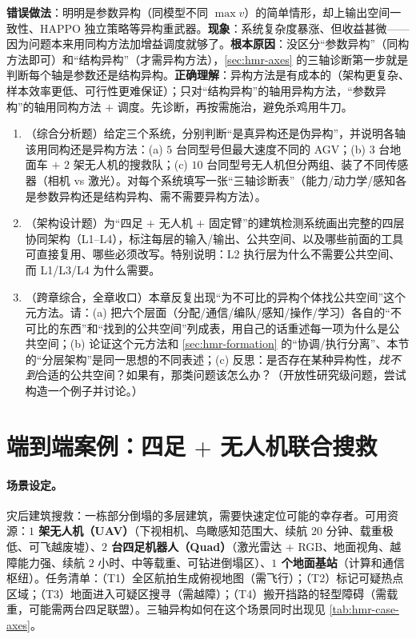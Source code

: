 \begin{pitfall}
\textbf{错误做法}：明明是参数异构（同模型不同 $\max v$）的简单情形，却上输出空间一致性、HAPPO 独立策略等异构重武器。\textbf{现象}：系统复杂度暴涨、但收益甚微——因为问题本来用同构方法加增益调度就够了。\textbf{根本原因}：没区分“参数异构”（同构方法即可）和“结构异构”（才需异构方法），\cref{sec:hmr-axes} 的三轴诊断第一步就是判断每个轴是参数还是结构异构。\textbf{正确理解}：异构方法是有成本的（架构更复杂、样本效率更低、可行性更难保证）；只对“结构异构”的轴用异构方法，“参数异构”的轴用同构方法 $+$ 调度。先诊断，再按需施治，避免杀鸡用牛刀。
\end{pitfall}

\begin{practice}
\begin{enumerate}
  \item （综合分析题）给定三个系统，分别判断“是真异构还是伪异构”，并说明各轴该用同构还是异构方法：(a) $5$ 台同型号但最大速度不同的 AGV；(b) $3$ 台地面车 $+$ $2$ 架无人机的搜救队；(c) $10$ 台同型号无人机但分两组、装了不同传感器（相机 vs 激光）。对每个系统填写一张“三轴诊断表”（能力/动力学/感知各是参数异构还是结构异构、需不需要异构方法）。
  \item （架构设计题）为“四足 $+$ 无人机 $+$ 固定臂”的建筑检测系统画出完整的四层协同架构（L1--L4），标注每层的输入/输出、公共空间、以及哪些前面的工具可直接复用、哪些必须改写。特别说明：L2 执行层为什么不需要公共空间、而 L1/L3/L4 为什么需要。
  \item （跨章综合，全章收口）本章反复出现“为不可比的异构个体找公共空间”这个元方法。请：(a) 把六个层面（分配/通信/编队/感知/操作/学习）各自的“不可比的东西”和“找到的公共空间”列成表，用自己的话重述每一项为什么是公共空间；(b) 论证这个元方法和 \cref{sec:hmr-formation} 的“协调/执行分离”、本节的“分层架构”是同一思想的不同表述；(c) 反思：是否存在某种异构性，\emph{找不到}合适的公共空间？如果有，那类问题该怎么办？（开放性研究级问题，尝试构造一个例子并讨论。）
\end{enumerate}
\end{practice}

\section{端到端案例：四足 \texorpdfstring{$+$}{+} 无人机联合搜救}
\label{sec:hmr-case}

\paragraph{场景设定。}
灾后建筑搜救：一栋部分倒塌的多层建筑，需要快速定位可能的幸存者。可用资源：\textbf{$1$ 架无人机（UAV）}（下视相机、鸟瞰感知范围大、续航 $20$ 分钟、载重极低、可飞越废墟）、\textbf{$2$ 台四足机器人（Quad）}（激光雷达 $+$ RGB、地面视角、越障能力强、续航 $2$ 小时、中等载重、可钻进倒塌区）、\textbf{$1$ 个地面基站}（计算和通信枢纽）。任务清单：（T1）全区航拍生成俯视地图（需飞行）；（T2）标记可疑热点区域；（T3）地面进入可疑区搜寻（需越障）；（T4）搬开挡路的轻型障碍（需载重，可能需两台四足联盟）。三轴异构如何在这个场景同时出现见 \cref{tab:hmr-case-axes}。

